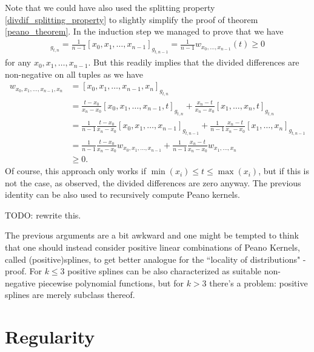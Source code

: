 Note that we could have also used the splitting property \ref{divdif_splitting_property} to slightly simplify the proof of theorem \ref{peano_theorem}. In the induction step we managed to prove that we have
\begin{align*}
	[x_{0}, x_{1}, \ldots, x_{n - 1}, t]_{g_{t, n}} = \frac{1}{n - 1}[x_{0}, x_{1}, \ldots, x_{n - 1}]_{g_{t, n - 1}} =  \frac{1}{n - 1} w_{x_{0}, \ldots, x_{n - 1}}(t)\geq 0
\end{align*}
for any $x_{0}, x_{1}, \ldots, x_{n - 1}$. But this readily implies that the divided differences are non-negative on all tuples as we have
\begin{align*}
	w_{x_{0}, x_{1}, \ldots, x_{n - 1}, x_{n}} &= [x_{0}, x_{1}, \ldots, x_{n - 1}, x_{n}]_{g_{t, n}} \\
	&= \frac{t - x_{0}}{x_{n} - x_{0}} [x_{0}, x_{1}, \ldots, x_{n - 1}, t]_{g_{t, n}} + \frac{x_{n} - t}{x_{n} - x_{0}} [x_{1}, \ldots, x_{n}, t]_{g_{t, n}} \\
	&= \frac{1}{n - 1} \frac{t - x_{0}}{x_{n} - x_{0}} [x_{0}, x_{1}, \ldots, x_{n - 1}]_{g_{t, n - 1}} + \frac{1}{n - 1}\frac{x_{n} - t}{x_{n} - x_{0}} [x_{1}, \ldots, x_{n}]_{g_{t, n - 1}} \\
	&= \frac{1}{n - 1}  \frac{t - x_{0}}{x_{n} - x_{0}} w_{x_{0}, x_{1}, \ldots, x_{n - 1}} + \frac{1}{n - 1}\frac{x_{n} - t}{x_{n} - x_{0}} w_{x_{1}, \ldots, x_{n}} \\
	&\geq 0.
\end{align*}
Of course, this approach only works if $\min(x_{i}) \leq t \leq \max(x_{i})$, but if this is not the case, as observed, the divided differences are zero anyway. The previous identity can be also used to recursively compute Peano kernels.

\begin{huom}
	TODO: rewrite this.

	The previous arguments are a bit awkward and one might be tempted to think that one should instead consider positive linear combinations of Peano Kernels, called (positive)splines, to get better analogue for the ``locality of distributions" -proof. For $k \leq 3$ positive splines can be also characterized as suitable non-negative piecewise polynomial functions, but for $k > 3$ there's a problem: positive splines are merely subclass thereof.
\end{huom}

\section{Regularity}

